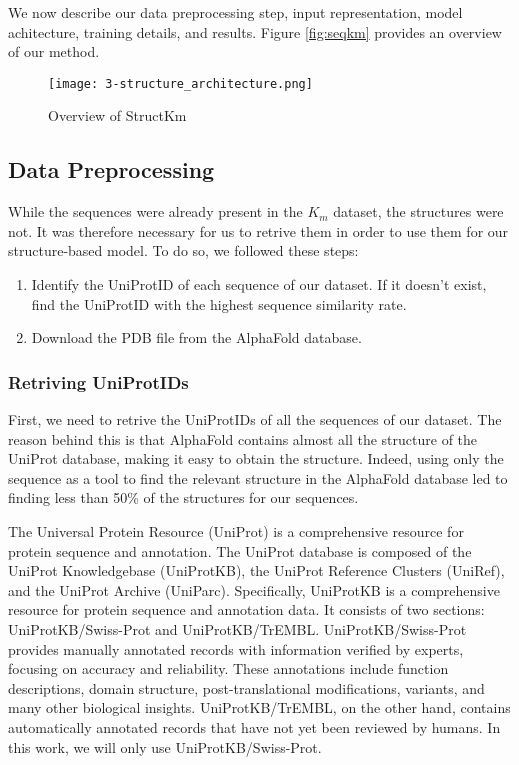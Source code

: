 We now describe our data preprocessing step, input representation, model achitecture, training details, and results. 
Figure \ref{fig:seqkm} provides an overview of our method.

\begin{figure}
  \centering
  \texttt{[image: 3-structure\_architecture.png]}
  \caption{Overview of StructKm}
  \label{fig:structkm}
\end{figure}

\subsection{Data Preprocessing}

While the sequences were already present in the $K_m$ dataset, the structures were not. It was therefore necessary
for us to retrive them in order to use them for our structure-based model. To do so, we followed these steps:
\begin{enumerate}
  \item Identify the UniProtID of each sequence of our dataset. If it doesn't exist, find the UniProtID with the 
  highest sequence similarity rate.
  \item Download the PDB file from the AlphaFold database.
\end{enumerate}

\subsubsection{Retriving UniProtIDs}
First, we need to retrive the UniProtIDs of all the sequences of our dataset. The reason behind this is that
AlphaFold contains almost all the structure of the UniProt database, making it easy to obtain the structure.
Indeed, using only the sequence as a tool to find the relevant structure in the AlphaFold database led to finding
less than 50\% of the structures for our sequences.

The Universal Protein Resource (UniProt) is a comprehensive resource for protein sequence and annotation. The 
UniProt database is composed of the UniProt Knowledgebase (UniProtKB), the UniProt Reference Clusters (UniRef), 
and the UniProt Archive (UniParc). Specifically, UniProtKB is a comprehensive resource for protein sequence 
and annotation data. It consists of two sections: UniProtKB/Swiss-Prot and UniProtKB/TrEMBL. 
UniProtKB/Swiss-Prot provides manually annotated records with information verified by experts, 
focusing on accuracy and reliability. These annotations include function descriptions, 
domain structure, post-translational modifications, variants, and many other biological insights. 
UniProtKB/TrEMBL, on the other hand, contains automatically annotated records that have not yet been 
reviewed by humans. In this work, we will only use UniProtKB/Swiss-Prot.

